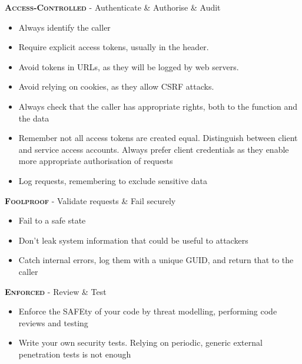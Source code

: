 \documentclass[a5paper,pagesize,10pt,bibtotoc,DIV=10,twoside]{scrbook}
\begin{document}
\hspace*{-0.5cm}\textsc{\textbf{\textcolor{safe}{\textbf{Access-Controlled}} }} - Authenticate \& Authorise \& Audit

\begin{itemize}
\item Always identify the caller
\item Require explicit access tokens, usually in the header.
\item Avoid tokens in URLs, as they will be logged by web servers. 
\item Avoid relying on cookies, as they allow CSRF attacks.
\item Always check that the caller has appropriate rights, both to the function and the data
\item Remember not all access tokens are created equal. Distinguish between client and service access accounts. Always prefer client credentials as they enable more appropriate authorisation of requests
\item Log requests, remembering to exclude sensitive data
\end{itemize}

\hspace*{-0.5cm}\textsc{\textbf{\textcolor{safe}{\textbf{Foolproof}} }} - Validate requests \& Fail securely

\begin{itemize}
\item Fail to a safe state
\item Don't leak system information that could be useful to attackers
\item Catch internal errors, log them with a unique GUID, and return that to the caller
\end{itemize}

\hspace*{-0.5cm}\textsc{\textbf{\textcolor{safe}{\textbf{Enforced}} }} - Review \& Test

\begin{itemize}
\item Enforce the SAFEty of your code by threat modelling, performing code reviews and testing
\item Write your own security tests. Relying on periodic, generic external penetration tests is not enough
\end{itemize}


\end{document}
